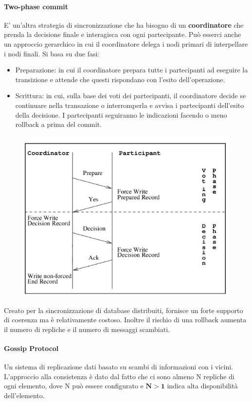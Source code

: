 \documentclass{article}
\begin{document}
		\paragraph{Two-phase commit}
		E' un'altra strategia di sincronizzazione che ha bisogno di un \textbf{coordinatore} che prenda la decisione finale e interagisca con ogni partecipante. Può esserci anche un approccio gerarchico in cui il coordinatore delega i nodi primari di interpellare i nodi finali.
		Si basa su due fasi:
		\begin{itemize}
			\item Preparazione: in cui il coordinatore prepara tutte i partecipanti ad eseguire la transizione e attende che questi rispondano con l'esito dell'operazione.
			\item Scrittura: in cui, sulla base dei voti dei partecipanti, il coordinatore decide se continuare nella transazione o interromperla e avvisa i partecipanti dell'esito della decisione. I partecipanti seguiranno le indicazioni facendo o meno rollback a prima del commit.
		\end{itemize}
		\begin{figure}[ht]
			\centering
			\includegraphics[width=0.5\linewidth]{SAC_A5_twophase}
			\label{fig:saca5twophase}
		\end{figure}
		Creato per la sincronizzazione di database distribuiti, fornisce un forte supporto di coerenza ma è relativamente costoso. Inoltre il rischio di una rollback aumenta il numero di repliche e il numero di messaggi scambiati.
		
		\paragraph{Gossip Protocol}
		Un sistema di replicazione dati basato su scambi di informazioni con i vicini. L'approccio alla consistenza è dato dal fatto che ci sono almeno N repliche di ogni elemento, dove N può essere configurato e $\mathbf{N > 1}$ indica alta disponibilità dell'elemento.\\
		
\end{document}
